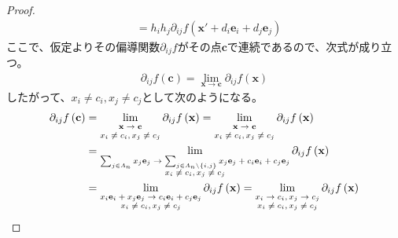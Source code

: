 \documentclass[dvipdfmx]{jsarticle}
\begin{document}
\begin{proof}
\begin{align*}
&= h_{i}h_{j}\partial_{ij}f\left( \mathbf{x}' + d_{i}\mathbf{e}_{i} + d_{j}\mathbf{e}_{j} \right)
\end{align*}
ここで、仮定よりその偏導関数$\partial_{ij}f$がその点$\mathbf{c}$で連続であるので、次式が成り立つ。
\begin{align*}
\partial_{ij}f\left( \mathbf{c} \right) = \lim_{\mathbf{x} \rightarrow \mathbf{c}}{\partial_{ij}f\left( \mathbf{x} \right)}
\end{align*}
したがって、$x_{i} \neq c_{i},x_{j} \neq c_{j}$として次のようになる。
\begin{align*}
\partial_{ij}f\left( \mathbf{c} \right) &= \lim_{\scriptsize \begin{matrix}
\mathbf{x} \rightarrow \mathbf{c} \\
x_{i} \neq c_{i},x_{j} \neq c_{j} \\
\end{matrix}}{\partial_{ij}f\left( \mathbf{x} \right)} = \lim_{\scriptsize \begin{matrix}
\mathbf{x} \rightarrow \mathbf{c} \\
x_{i} \neq c_{i},x_{j} \neq c_{j} \\
\end{matrix}}{\partial_{ij}f\left( \mathbf{x} \right)}\\
&= \lim_{\scriptsize \begin{matrix}
\sum_{j \in \varLambda_{n}} {x_{j}\mathbf{e}_{j}} \rightarrow \sum_{j \in \varLambda_{n} \setminus \left\{ i,j \right\}} {x_{j}\mathbf{e}_{j}} + c_{i}\mathbf{e}_{i} + c_{j}\mathbf{e}_{j} \\
x_{i} \neq c_{i},x_{j} \neq c_{j} \\
\end{matrix}}{\partial_{ij}f\left( \mathbf{x} \right)}\\
&= \lim_{\scriptsize \begin{matrix}
x_{i}\mathbf{e}_{i} + x_{j}\mathbf{e}_{j} \rightarrow c_{i}\mathbf{e}_{i} + c_{j}\mathbf{e}_{j} \\
x_{i} \neq c_{i},x_{j} \neq c_{j} \\
\end{matrix}}{\partial_{ij}f\left( \mathbf{x} \right)} = \lim_{\scriptsize \begin{matrix}
x_{i} \rightarrow c_{i},x_{j} \rightarrow c_{j} \\
x_{i} \neq c_{i},x_{j} \neq c_{j} \\
\end{matrix}}{\partial_{ij}f\left( \mathbf{x} \right)}
\end{align*}

\end{proof}
\end{document}
